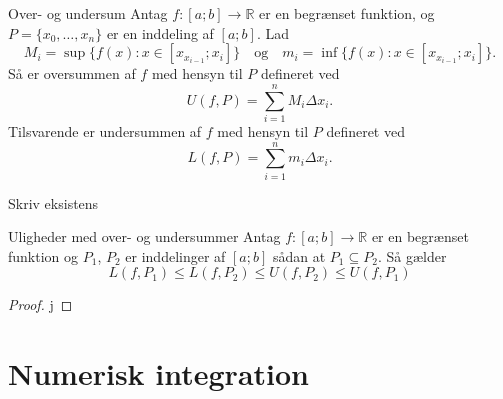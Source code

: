 \documentclass{article}
\begin{document}
\begin{definition}{Over- og undersum}{}
  Antag $f:[a;b] \to \mathbb{R}$ er en begrænset funktion, og $P=\{x_0,\ldots, x_n\}$ er en inddeling af $[a;b]$. 
  Lad 
  \[
  M_i=\sup \{ f(x):x \in [x _{x_{i-1}};x_i] \} \quad{\text{og}} \quad m_i=\inf \{ f(x):x \in [x _{x_{i-1}};x_i] \}.
  \] 
  Så er oversummen af $f$ med hensyn til $P$ defineret ved
  \[
  U(f,P)=\sum_{i=1}^{n} M_i \Delta x_i.
  \] 
  Tilsvarende er undersummen af $f$ med hensyn til $P$ defineret ved
  \[
  L(f,P)=\sum_{i=1}^{n} m_i \Delta x_i.
  \] 
\end{definition}
Skriv eksistens

\begin{theorem}{Uligheder med over- og undersummer}{}
  Antag $f:[a;b] \to \mathbb{R}$ er en begrænset funktion og $P_1$, $P_2$ er inddelinger af $[a;b]$ sådan at $P_1 \subseteq P_2$. Så gælder
  \[
  L(f,P_1)\leq L(f,P_2) \leq U(f,P_2) \leq U(f,P_1)
  \] 
\end{theorem}
\begin{proof} 
  j
\end{proof}

\section{Numerisk integration}%
\label{sec:Numerisk integration}



\newpage
\singlespacing %
\setlength{\bibsep}{5pt} %
\thispagestyle{empty} %
\end{document}
